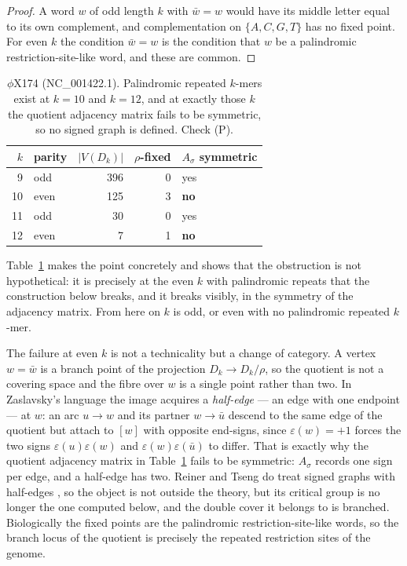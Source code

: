 \begin{proof}
A word $w$ of odd length $k$ with $\bar w=w$ would have its middle letter equal to its own
complement, and complementation on $\{A,C,G,T\}$ has no fixed point. For even $k$ the
condition $\bar w=w$ is the condition that $w$ be a palindromic restriction-site-like word,
and these are common.
\end{proof}

\begin{table}[t]
\centering
\begin{tabular}{rlrrl}
\toprule
$k$ & parity & $|V(D_k)|$ & $\rho$-fixed & $A_\sigma$ symmetric\\
\midrule
 9 & odd  & 396 & 0 & yes\\
10 & even & 125 & 3 & \textbf{no}\\
11 & odd  &  30 & 0 & yes\\
12 & even &   7 & 1 & \textbf{no}\\
\bottomrule
\end{tabular}
\caption{$\phi$X174 (NC\_001422.1). Palindromic repeated $k$-mers exist at $k=10$ and
$k=12$, and at exactly those $k$ the quotient adjacency matrix fails to be symmetric, so no
signed graph is defined. Check (P).}
\label{ch06:tab:parity}
\end{table}

Table~\ref{ch06:tab:parity} makes the point concretely and shows that the obstruction is not
hypothetical: it is precisely at the even $k$ with palindromic repeats that the construction
below breaks, and it breaks visibly, in the symmetry of the adjacency matrix. From here on
$k$ is odd, or even with no palindromic repeated $k$-mer.

\begin{remark}\label{ch06:rem:halfedge}
The failure at even $k$ is not a technicality but a change of category. A vertex $w=\bar w$
is a branch point of the projection $D_k\to D_k/\rho$, so the quotient is not a covering
space and the fibre over $w$ is a single point rather than two. In Zaslavsky's language the
image acquires a \emph{half-edge} --- an edge with one endpoint --- at $w$: an arc $u\to w$
and its partner $w\to\bar u$ descend to the same edge of the quotient but attach to $[w]$
with opposite end-signs, since $\varepsilon(w)=+1$ forces the two signs
$\varepsilon(u)\varepsilon(w)$ and $\varepsilon(w)\varepsilon(\bar u)$ to differ. That is
exactly why the quotient adjacency matrix in Table~\ref{ch06:tab:parity} fails to be symmetric:
$A_\sigma$ records one sign per edge, and a half-edge has two. Reiner and Tseng do treat
signed graphs with half-edges \cite[\S9]{RT14}, so the object is not outside the theory, but
its critical group is no longer the one computed below, and the double cover it belongs to is
branched. Biologically the fixed points are the palindromic restriction-site-like words, so
the branch locus of the quotient is precisely the repeated restriction sites of the genome.
\end{remark}

